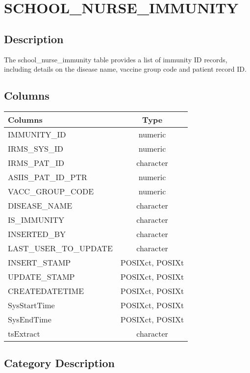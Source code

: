 \documentclass[
  letterpaper,
  DIV=11,
  numbers=noendperiod]{scrreprt}
\begin{document}
\hypertarget{school_nurse_immunity}{%
\chapter*{SCHOOL\_NURSE\_IMMUNITY}\label{school_nurse_immunity}}

\hypertarget{description-36}{%
\section*{Description}\label{description-36}}

The school\_nurse\_immunity table provides a list of immunity ID
records, including details on the disease name, vaccine group code and
patient record ID.

\hypertarget{columns-36}{%
\section*{Columns}\label{columns-36}}

\begin{longtable}{lc}
\toprule
Columns & Type \\ 
\midrule
IMMUNITY\_ID & numeric \\ 
IRMS\_SYS\_ID & numeric \\ 
IRMS\_PAT\_ID & character \\ 
ASIIS\_PAT\_ID\_PTR & numeric \\ 
VACC\_GROUP\_CODE & numeric \\ 
DISEASE\_NAME & character \\ 
IS\_IMMUNITY & character \\ 
INSERTED\_BY & character \\ 
LAST\_USER\_TO\_UPDATE & character \\ 
INSERT\_STAMP & POSIXct, POSIXt \\ 
UPDATE\_STAMP & POSIXct, POSIXt \\ 
CREATEDATETIME & POSIXct, POSIXt \\ 
SysStartTime & POSIXct, POSIXt \\ 
SysEndTime & POSIXct, POSIXt \\ 
tsExtract & character \\ 
\bottomrule
\end{longtable}

\hypertarget{category-description-36}{%
\section*{Category Description}\label{category-description-36}}
\end{document}
